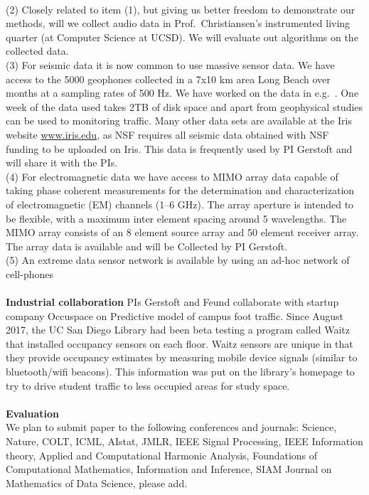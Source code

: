\documentclass{article}
\begin{document}
\\
(2)
Closely related to item (1), but giving us better freedom to demonstrate our methods, will we collect audio data in Prof.\ Christiansen's instrumented living
quarter (at Computer Science at UCSD). We will evaluate out algorithms on the collected data.
\\
(3) For seismic data it is now common to use massive sensor data. We have access to the 5000 geophones collected in a 7x10 km area Long Beach over months at a sampling rates of 500 Hz. We have worked on the data in e.g.\ \cite{riahi2017}. One week of the data used takes 2TB of disk space and apart from geophysical studies can be used to monitoring traffic\cite{riahi2015}. Many other data sets are available at the Iris website \href{www.iris.edu}{www.iris.edu}, as NSF requires all seismic data obtained with NSF funding to be uploaded on Iris. This data is frequently used by PI Gerstoft and will share it with the PIs.
\\
(4) For electromagnetic data we have access to MIMO array data  capable of taking phase coherent measurements for the determination and characterization of electromagnetic (EM) channels (1--6 GHz). The array aperture is intended to be flexible, with a maximum inter element spacing around 5 wavelengths. The MIMO array consists of an 8 element source array and 50 element receiver array. The array data is available and will be Collected by PI Gerstoft.
\\
(5) An extreme data sensor network is available by using an ad-hoc network of cell-phones
\\
\\
{\bf Industrial collaboration}
PIs Gerstoft and Feund collaborate with startup company  Occuspace on
Predictive model of campus foot traffic. Since August 2017, the UC San Diego Library had been beta testing a program called Waitz that installed occupancy sensors on each floor. Waitz sensors are unique in that they provide occupancy estimates by measuring mobile device signals (similar to bluetooth/wifi beacons). This information was put on the library’s homepage to try to drive student traffic to less occupied areas for study space. 
\\
\\
{\bf Evaluation}\\
We plan to submit paper to the following conferences and journals:
Science, Nature, COLT, ICML, AIstat, JMLR, IEEE Signal Processing, IEEE Information
theory, Applied and Computational Harmonic Analysis, Foundations of Computational Mathematics, Information and Inference, SIAM Journal on Mathematics of Data Science, please add.
\end{document}

